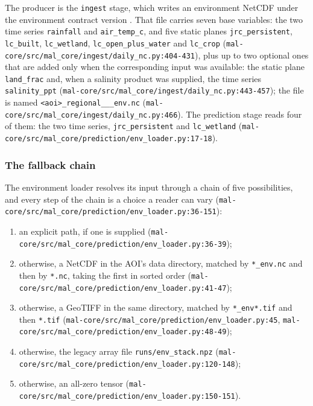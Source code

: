 \documentclass[11pt,a4paper]{article}
\newcommand{\code}[1]{\texttt{#1}}
\begin{document}
The producer is the \code{ingest} stage, which writes an environment NetCDF
under the environment contract version . That file
carries seven base variables: the two time series \code{rainfall} and
\code{air\_temp\_c}, and five static planes \code{jrc\_persistent},
\code{lc\_built}, \code{lc\_wetland}, \code{lc\_open\_plus\_water} and
\code{lc\_crop}
(\code{mal-core/src/mal\_core/ingest/daily\_nc.py:404-431}), plus up to two
optional ones that are added only when the corresponding input was available:
the static plane \code{land\_frac} and, when a salinity product was supplied,
the time series \code{salinity\_ppt}
(\code{mal-core/src/mal\_core/ingest/daily\_nc.py:443-457}); the file is
named \code{<aoi>\_regional\_<y0>\_<y1>\_env.nc}
(\code{mal-core/src/mal\_core/ingest/daily\_nc.py:466}). The prediction stage
reads four of them: the two time series, \code{jrc\_persistent} and
\code{lc\_wetland}
(\code{mal-core/src/mal\_core/prediction/env\_loader.py:17-18}).

\subsubsection{The fallback chain}

The environment loader resolves its input through a chain of five
possibilities, and every step of the chain is a choice a reader can vary
(\code{mal-core/src/mal\_core/prediction/env\_loader.py:36-151}):

\begin{enumerate}
\item an explicit path, if one is supplied
  (\code{mal-core/src/mal\_core/prediction/env\_loader.py:36-39});
\item otherwise, a NetCDF in the AOI's data directory, matched by
  \code{*\_env.nc} and then by \code{*.nc}, taking the first in sorted order
  (\code{mal-core/src/mal\_core/prediction/env\_loader.py:41-47});
\item otherwise, a GeoTIFF in the same directory, matched by \code{*\_env*.tif}
  and then \code{*.tif} (\code{mal-core/src/mal\_core/prediction/env\_loader.py:45},
  \code{mal-core/src/mal\_core/prediction/env\_loader.py:48-49});
\item otherwise, the legacy array file \code{runs/env\_stack.npz}
  (\code{mal-core/src/mal\_core/prediction/env\_loader.py:120-148});
\item otherwise, an all-zero tensor
  (\code{mal-core/src/mal\_core/prediction/env\_loader.py:150-151}).
\end{enumerate}
\end{document}
